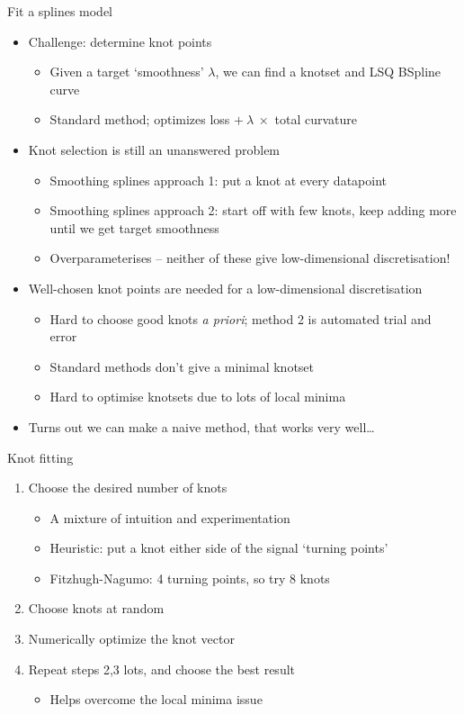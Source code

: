\documentclass[presentation]{beamer}
\begin{document}
\begin{frame}[label={sec:org3821764}]{Fit a splines model}
\begin{itemize}[<+->]
\item Challenge: determine knot points
\begin{itemize}
\item Given a target `smoothness' \(\lambda\), we can find a knotset and LSQ BSpline curve
\item Standard method; optimizes loss \(+~\lambda~\times\) total curvature
\end{itemize}
\item Knot selection is still an unanswered problem
\begin{itemize}
\item Smoothing splines approach 1: put a knot at every datapoint
\item Smoothing splines approach 2: start off with few knots, keep adding more until we get target smoothness
\item Overparameterises -- neither of these give low-dimensional discretisation!
\end{itemize}
\item Well-chosen knot points are needed for a low-dimensional discretisation
\begin{itemize}
\item Hard to choose good knots \emph{a priori}; method 2 is automated trial and error
\item Standard methods don't give a minimal knotset
\item Hard to optimise knotsets due to lots of local minima
\end{itemize}
\item \alert{Turns out we can make a naive method, that works very well\ldots{}}
\end{itemize}
\end{frame}

\begin{frame}[label={sec:orge18a1a2}]{Knot fitting}
\begin{enumerate}[<+->]
\item Choose the desired number of knots
\begin{itemize}
\item A mixture of intuition and experimentation
\item Heuristic: put a knot either side of the signal `turning points'
\item Fitzhugh-Nagumo: 4 turning points, so try 8 knots
\end{itemize}
\item Choose knots at random
\item Numerically optimize the knot vector
\item Repeat steps 2,3 lots, and choose the best result
\begin{itemize}
\item Helps overcome the local minima issue
\end{itemize}
\end{enumerate}
\end{frame}
\end{document}
